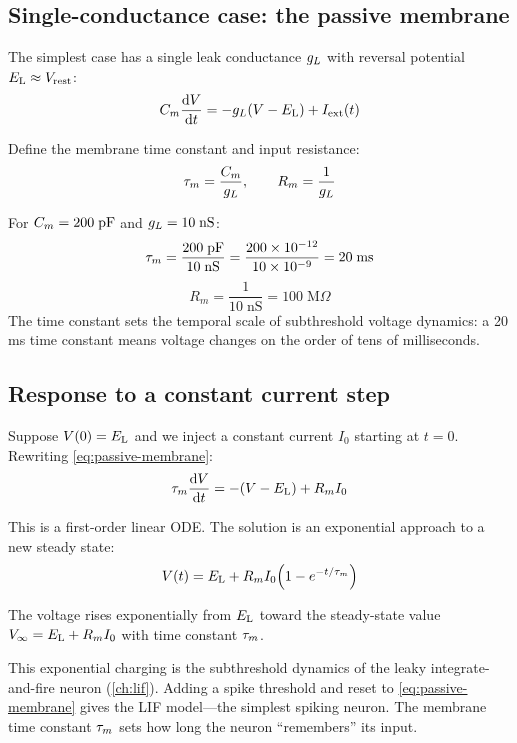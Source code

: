\subsection{Single-conductance case: the passive membrane}

The simplest case has a single leak conductance $g_L$ with reversal potential $E_{\mathrm{L}} \approx V_{\text{rest}}$:
%
\begin{equation}
  C_m\frac{\mathop{}\!\mathrm{d} V}{\mathop{}\!\mathrm{d} t} = -g_L(V - E_{\mathrm{L}}) + I_{\text{ext}}(t)
  \label{eq:passive-membrane}
\end{equation}

Define the membrane time constant and input resistance:
%
\begin{equation}
  \tau_m = \frac{C_m}{g_L}, \qquad R_m = \frac{1}{g_L}
  \label{eq:tau-Rm}
\end{equation}

\begin{aside}
For $C_m = 200\;\text{pF}$ and $g_L = 10\;\text{nS}$:
\[
  \tau_m = \frac{200\;\text{pF}}{10\;\text{nS}} = \frac{200 \times 10^{-12}}{10 \times 10^{-9}} = 20\;\text{ms}
\]
\[
  R_m = \frac{1}{10\;\text{nS}} = 100\;\text{M}\Omega
\]
The time constant sets the temporal scale of subthreshold voltage dynamics: a 20\,ms time constant means voltage changes on the order of tens of milliseconds.
\end{aside}

\subsection{Response to a constant current step}

Suppose $V(0) = E_{\mathrm{L}}$ and we inject a constant current $I_0$ starting at $t = 0$. Rewriting \cref{eq:passive-membrane}:
%
\begin{equation}
  \tau_m \frac{\mathop{}\!\mathrm{d} V}{\mathop{}\!\mathrm{d} t} = -(V - E_{\mathrm{L}}) + R_m I_0
\end{equation}

This is a first-order linear ODE. The solution is an exponential approach to a new steady state:
%
\begin{equation}
  V(t) = E_{\mathrm{L}} + R_m I_0 \Big(1 - e^{-t/\tau_m}\Big)
  \label{eq:step-response}
\end{equation}

The voltage rises exponentially from $E_{\mathrm{L}}$ toward the steady-state value $V_\infty = E_{\mathrm{L}} + R_m I_0$ with time constant $\tau_m$.

\begin{aside}
This exponential charging is the subthreshold dynamics of the leaky integrate-and-fire neuron (\cref{ch:lif}). Adding a spike threshold and reset to \cref{eq:passive-membrane} gives the LIF model---the simplest spiking neuron. The membrane time constant $\tau_m$ sets how long the neuron ``remembers'' its input.
\end{aside}

